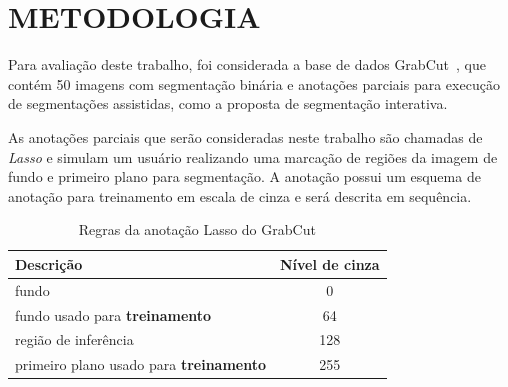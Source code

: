 \chapter{METODOLOGIA}\label{cap:metodologia}

Para avaliação deste trabalho, foi considerada a base de dados
GrabCut~\cite{rother2004grabcut}, que contém 50 imagens com segmentação
binária e anotações parciais para execução de segmentações assistidas,
como a proposta de segmentação interativa.

As anotações parciais que serão consideradas neste trabalho são
chamadas de \textit{Lasso} e simulam um usuário realizando uma
marcação de regiões da imagem de fundo e primeiro plano para
segmentação. A anotação possui um esquema de anotação para treinamento
em escala de cinza e será descrita em sequência.

\begin{figure}[h!]
        \captionsetup{width=12cm}
		\centering
\end{figure}
\FloatBarrier{}

\begin{table}[h]
  \centering
  \caption{Regras da anotação Lasso do GrabCut}
  \label{tab:grabcut-label}
  \begin{tabular}{lc}
    \toprule
    Descrição                                       & Nível de cinza \\
    \midrule \midrule
     fundo                                          & 0              \\
     fundo usado para \textbf{treinamento}          & 64             \\
     região de inferência                           & 128            \\
     primeiro plano usado para \textbf{treinamento} & 255            \\
    \bottomrule
  \end{tabular}
\end{table}



